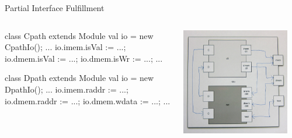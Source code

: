 \documentclass[xcolor=pdflatex,dvipsnames,table]{beamer}
\begin{document}
\begin{frame}[fragile]{Partial Interface Fulfillment}
\begin{columns}

\begin{scala}
class Cpath extends Module {
  val io = new CpathIo();
  ...
  io.imem.isVal := ...;
  io.dmem.isVal := ...;
  io.dmem.isWr  := ...;
  ...
}

class Dpath extends Module {
  val io = new DpathIo();
  ...
  io.imem.raddr := ...;
  io.dmem.raddr := ...;
  io.dmem.wdata := ...;
  ...
}
\end{scala}


\begin{center}
\includegraphics[width=0.9\textwidth]{../tutfigs/cpu.png} 
\end{center}

\end{columns}
\end{frame}
\end{document}
